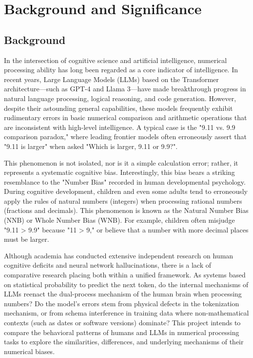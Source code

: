 \section{Background and Significance}

\subsection{Background}

In the intersection of cognitive science and artificial intelligence, numerical processing ability has long been regarded as a core indicator of intelligence. In recent years, Large Language Models (LLMs) based on the Transformer architecture—such as GPT-4 and Llama 3—have made breakthrough progress in natural language processing, logical reasoning, and code generation. However, despite their astounding general capabilities, these models frequently exhibit rudimentary errors in basic numerical comparison and arithmetic operations that are inconsistent with high-level intelligence. A typical case is the "9.11 vs. 9.9 comparison paradox," where leading frontier models often erroneously assert that "9.11 is larger" when asked "Which is larger, 9.11 or 9.9?"\cite{eval16x2025}.

This phenomenon is not isolated, nor is it a simple calculation error; rather, it represents a systematic cognitive bias. Interestingly, this bias bears a striking resemblance to the "Number Bias" recorded in human developmental psychology. During cognitive development, children and even some adults tend to erroneously apply the rules of natural numbers (integers) when processing rational numbers (fractions and decimals). This phenomenon is known as the Natural Number Bias (NNB) or Whole Number Bias (WNB)\cite{alibali2015}. For example, children often misjudge "9.11 > 9.9" because "11 > 9," or believe that a number with more decimal places must be larger.

Although academia has conducted extensive independent research on human cognitive deficits and neural network hallucinations, there is a lack of comparative research placing both within a unified framework. As systems based on statistical probability to predict the next token, do the internal mechanisms of LLMs reenact the dual-process mechanism of the human brain when processing numbers? Do the model's errors stem from physical defects in the tokenization mechanism\cite{singh2024}, or from schema interference in training data where non-mathematical contexts (such as dates or software versions) dominate? This project intends to compare the behavioral patterns of humans and LLMs in numerical processing tasks to explore the similarities, differences, and underlying mechanisms of their numerical biases.

